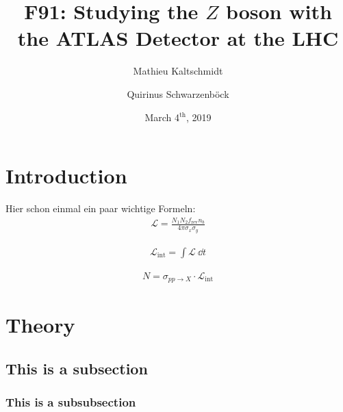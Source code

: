 \documentclass[twocolumn,
			   showpacs,%
               nofootinbib,
               aps,%
               prd,
               notitlepage,
               showkeys,
               10pt]{revtex4-1}
\begin{document}
\title{F91: Studying the $Z$ boson with the ATLAS Detector at the LHC }
\author{Mathieu Kaltschmidt}
\author{Quirinus Schwarzenb\"ock}

\date[Carried out in the week of  ]{March 4$^{\text{th}}$, 2019}


\begin{abstract}

\blindtext
\end{abstract}

\maketitle



\section{Introduction}
Hier schon einmal ein paar wichtige Formeln:
\begin{align}
\mathcal{L} = \frac{N_1N_2f_{\text{rev}}n_b}{4\pi\sigma_x\sigma_y}
\end{align}

\blindtext

\begin{align}
\mathcal{L}_{\text{int}} = \int \mathcal{L} \ \dd t	
\end{align}

\blindtext

\begin{align}
N = \sigma_{pp\rightarrow X} \cdot \mathcal{L}_{\text{int}}
\end{align}


\section{Theory}

\blindtext

\subsection{This is a subsection}

\subsubsection{This is a subsubsection}
\end{document}
